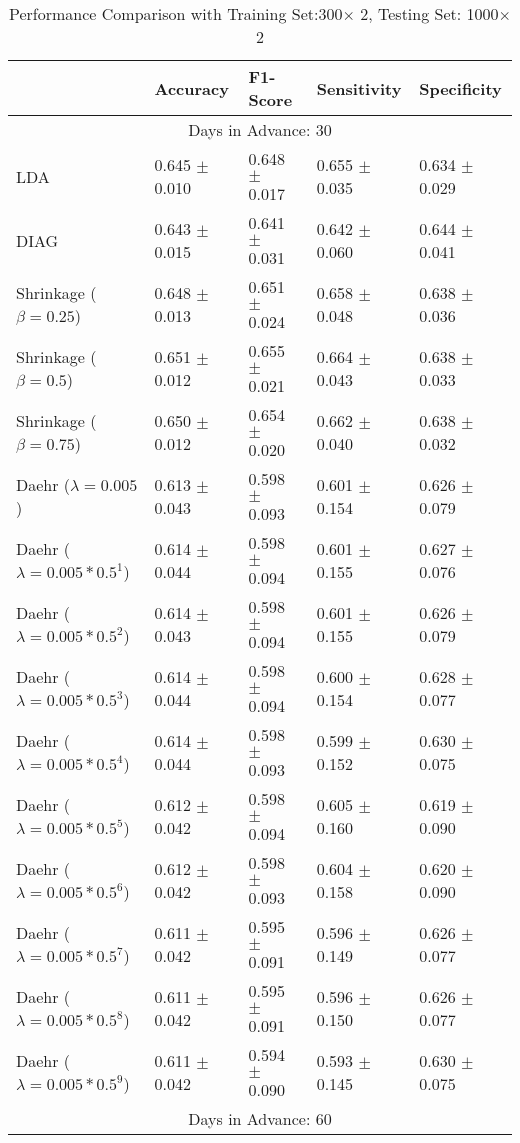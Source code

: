 \begin{table}
\caption{Performance Comparison with Training Set:300$\times$ 2, Testing Set: 1000$\times$2}
\footnotesize
\centering
\begin{tabular}{*{5}{l}}
\toprule
 & Accuracy & F1-Score & Sensitivity & Specificity\\
\hline\multicolumn{5}{c}{  Days in Advance: 30}\\\hline
LDA&0.645 $\pm$ 0.010&0.648 $\pm$ 0.017&0.655 $\pm$ 0.035&0.634 $\pm$ 0.029\\
DIAG&0.643 $\pm$ 0.015&0.641 $\pm$ 0.031&0.642 $\pm$ 0.060&0.644 $\pm$ 0.041\\
Shrinkage ($\beta=0.25$)&0.648 $\pm$ 0.013&0.651 $\pm$ 0.024&0.658 $\pm$ 0.048&0.638 $\pm$ 0.036\\
Shrinkage ($\beta=0.5$)&0.651 $\pm$ 0.012&0.655 $\pm$ 0.021&0.664 $\pm$ 0.043&0.638 $\pm$ 0.033\\
Shrinkage ($\beta=0.75$)&0.650 $\pm$ 0.012&0.654 $\pm$ 0.020&0.662 $\pm$ 0.040&0.638 $\pm$ 0.032\\
Daehr ($\lambda=0.005$)&0.613 $\pm$ 0.043&0.598 $\pm$ 0.093&0.601 $\pm$ 0.154&0.626 $\pm$ 0.079\\
Daehr ($\lambda=0.005*0.5^1$)&0.614 $\pm$ 0.044&0.598 $\pm$ 0.094&0.601 $\pm$ 0.155&0.627 $\pm$ 0.076\\
Daehr ($\lambda=0.005*0.5^2$)&0.614 $\pm$ 0.043&0.598 $\pm$ 0.094&0.601 $\pm$ 0.155&0.626 $\pm$ 0.079\\
Daehr ($\lambda=0.005*0.5^3$)&0.614 $\pm$ 0.044&0.598 $\pm$ 0.094&0.600 $\pm$ 0.154&0.628 $\pm$ 0.077\\
Daehr ($\lambda=0.005*0.5^4$)&0.614 $\pm$ 0.044&0.598 $\pm$ 0.093&0.599 $\pm$ 0.152&0.630 $\pm$ 0.075\\
Daehr ($\lambda=0.005*0.5^5$)&0.612 $\pm$ 0.042&0.598 $\pm$ 0.094&0.605 $\pm$ 0.160&0.619 $\pm$ 0.090\\
Daehr ($\lambda=0.005*0.5^6$)&0.612 $\pm$ 0.042&0.598 $\pm$ 0.093&0.604 $\pm$ 0.158&0.620 $\pm$ 0.090\\
Daehr ($\lambda=0.005*0.5^7$)&0.611 $\pm$ 0.042&0.595 $\pm$ 0.091&0.596 $\pm$ 0.149&0.626 $\pm$ 0.077\\
Daehr ($\lambda=0.005*0.5^8$)&0.611 $\pm$ 0.042&0.595 $\pm$ 0.091&0.596 $\pm$ 0.150&0.626 $\pm$ 0.077\\
Daehr ($\lambda=0.005*0.5^9$)&0.611 $\pm$ 0.042&0.594 $\pm$ 0.090&0.593 $\pm$ 0.145&0.630 $\pm$ 0.075\\
\hline\multicolumn{5}{c}{  Days in Advance: 60}\\\hline

\end{tabular}
\end{table}
